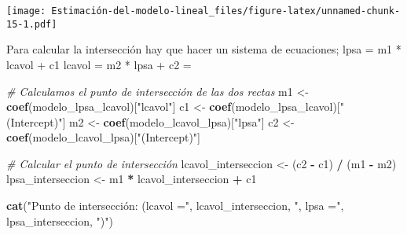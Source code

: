 \documentclass[
]{article}
\newenvironment{Shaded}{\begin{snugshade}}{\end{snugshade}}
\newcommand{\AttributeTok}[1]{\textcolor[rgb]{0.13,0.29,0.53}{#1}}
\newcommand{\CommentTok}[1]{\textcolor[rgb]{0.56,0.35,0.01}{\textit{#1}}}
\newcommand{\DecValTok}[1]{\textcolor[rgb]{0.00,0.00,0.81}{#1}}
\newcommand{\FunctionTok}[1]{\textcolor[rgb]{0.13,0.29,0.53}{\textbf{#1}}}
\newcommand{\NormalTok}[1]{#1}
\newcommand{\OtherTok}[1]{\textcolor[rgb]{0.56,0.35,0.01}{#1}}
\newcommand{\SpecialCharTok}[1]{\textcolor[rgb]{0.81,0.36,0.00}{\textbf{#1}}}
\newcommand{\StringTok}[1]{\textcolor[rgb]{0.31,0.60,0.02}{#1}}
\begin{document}
\begin{Shaded}
\end{Shaded}

\texttt{[image: Estimación-del-modelo-lineal\_files/figure-latex/unnamed-chunk-15-1.pdf]}

Para calcular la intersección hay que hacer un sistema de ecuaciones;
lpsa = m1 * lcavol + c1 lcavol = m2 * lpsa + c2 =

\begin{Shaded}
\begin{Highlighting}[]
\CommentTok{\# Calculamos el punto de intersección de las dos rectas}
\NormalTok{m1 }\OtherTok{\textless{}{-}} \FunctionTok{coef}\NormalTok{(modelo\_lpsa\_lcavol)[}\StringTok{"lcavol"}\NormalTok{]}
\NormalTok{c1 }\OtherTok{\textless{}{-}} \FunctionTok{coef}\NormalTok{(modelo\_lpsa\_lcavol)[}\StringTok{"(Intercept)"}\NormalTok{]}
\NormalTok{m2 }\OtherTok{\textless{}{-}} \FunctionTok{coef}\NormalTok{(modelo\_lcavol\_lpsa)[}\StringTok{"lpsa"}\NormalTok{]}
\NormalTok{c2 }\OtherTok{\textless{}{-}} \FunctionTok{coef}\NormalTok{(modelo\_lcavol\_lpsa)[}\StringTok{"(Intercept)"}\NormalTok{]}


\CommentTok{\# Calcular el punto de intersección}
\NormalTok{lcavol\_interseccion }\OtherTok{\textless{}{-}}\NormalTok{ (c2 }\SpecialCharTok{{-}}\NormalTok{ c1) }\SpecialCharTok{/}\NormalTok{ (m1 }\SpecialCharTok{{-}}\NormalTok{ m2)}
\NormalTok{lpsa\_interseccion }\OtherTok{\textless{}{-}}\NormalTok{ m1 }\SpecialCharTok{*}\NormalTok{ lcavol\_interseccion }\SpecialCharTok{+}\NormalTok{ c1}


\FunctionTok{cat}\NormalTok{(}\StringTok{"Punto de intersección: (lcavol ="}\NormalTok{, lcavol\_interseccion, }\StringTok{", lpsa ="}\NormalTok{, lpsa\_interseccion, }\StringTok{")"}\NormalTok{)}
\end{Highlighting}
\end{Shaded}
\end{document}
